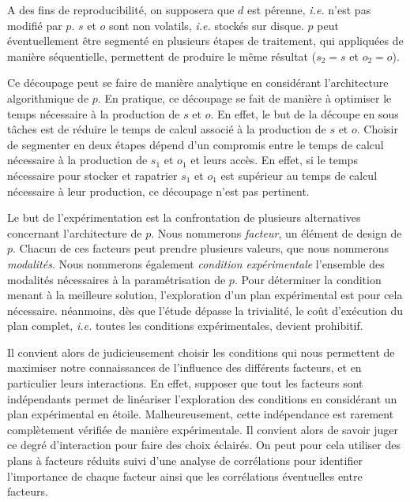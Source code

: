 A des fins de reproducibilité, on supposera que $d$ est pérenne, \textit{i.e.} n'est pas modifié par $p$. $s$ et $o$ sont non volatils, \textit{i.e.} stockés sur disque. $p$ peut éventuellement être segmenté en plusieurs étapes de traitement, qui appliquées de manière séquentielle, permettent de produire le même résultat ($s_2=s$ et $o_2=o$).



Ce découpage peut se faire de manière analytique en considérant l'architecture algorithmique de $p$. En pratique, ce découpage se fait de manière à optimiser le temps nécessaire à la production de $s$ et $o$. En effet, le but de la découpe en sous tâches est de réduire le temps de calcul associé à la production de $s$ et $o$. Choisir de segmenter en deux étapes dépend d'un compromis entre le temps de calcul nécessaire à la production de $s_1$ et $o_1$ et leurs accès. En effet, si le temps nécessaire pour stocker et rapatrier $s_1$ et $o_1$ est supérieur au temps de calcul nécessaire à leur production, ce découpage n'est pas pertinent.

Le but de l'expérimentation est la confrontation de plusieurs alternatives concernant l'architecture de $p$. Nous nommerons \textsl{facteur}, un élément de design de $p$. Chacun de ces facteurs peut prendre plusieurs valeurs, que nous nommerons \textsl{modalités}. Nous nommerons également \textsl{condition expérimentale} l'ensemble des modalités nécessaires à la  paramétrisation de $p$. Pour déterminer la condition menant à la meilleure solution, l'exploration d'un plan expérimental est pour cela nécessaire. néanmoins, dès que l'étude dépasse la trivialité, le coût d'exécution du plan complet, \textit{i.e.} toutes les conditions expérimentales, devient prohibitif.

Il convient alors de judicieusement choisir les conditions qui nous permettent de maximiser notre connaissances de l'influence des différents facteurs, et en particulier leurs interactions. En effet, supposer que tout les facteurs sont indépendants permet de linéariser l'exploration des conditions en considérant un plan expérimental en étoile. Malheureusement, cette indépendance est rarement complètement vérifiée de manière expérimentale. Il convient alors de savoir juger ce degré d'interaction pour faire des choix éclairés. On peut pour cela utiliser des plans à facteurs réduits suivi d'une analyse de corrélations pour identifier l'importance de chaque facteur ainsi que les corrélations éventuelles entre facteurs.

